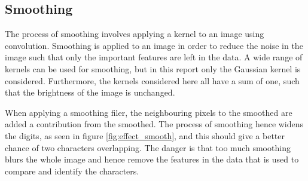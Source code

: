 \subsection{Smoothing}
\label{sec:smoothing}
The process of smoothing involves applying a kernel to an image using convolution.
Smoothing is applied to an image in order to reduce the noise in the image such that only the important features are left in the data.
A wide range of kernels can be used for smoothing, but in this report only the Gaussian kernel is considered.
Furthermore, the kernels considered here all have a sum of one, such that the brightness of the image is unchanged.

When applying a smoothing filer, the neighbouring pixels to the smoothed are added a contribution from the smoothed.
The process of smoothing hence widens the digits, as seen in figure \ref{fig:effect_smooth}, and this should give a better chance of two characters overlapping.
The danger is that too much smoothing blurs the whole image and hence remove the features in the data that is used to compare and identify the characters.

